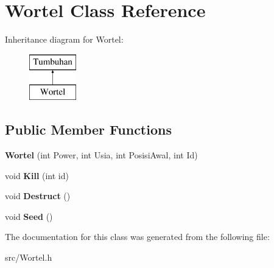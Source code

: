 \hypertarget{class_wortel}{}\section{Wortel Class Reference}
\label{class_wortel}
Inheritance diagram for Wortel\+:\begin{figure}[H]
\begin{center}
\leavevmode
\includegraphics[height=2.000000cm]{class_wortel}
\end{center}
\end{figure}
\subsection*{Public Member Functions}
\begin{DoxyCompactItemize}
\item 
\hypertarget{class_wortel_a5cacd30f4c7133c7a9c657da54f88d16}{}{\bfseries Wortel} (int Power, int Usia, int Posisi\+Awal, int Id)\label{class_wortel_a5cacd30f4c7133c7a9c657da54f88d16}

\item 
\hypertarget{class_wortel_af7a79a9e1b4d15bd3f7498beb0ea8be1}{}void {\bfseries Kill} (int id)\label{class_wortel_af7a79a9e1b4d15bd3f7498beb0ea8be1}

\item 
\hypertarget{class_wortel_a520a82f28b6c65b98605d051768e88b7}{}void {\bfseries Destruct} ()\label{class_wortel_a520a82f28b6c65b98605d051768e88b7}

\item 
\hypertarget{class_wortel_aa5acbe42d876893154b87c924e4e02a4}{}void {\bfseries Seed} ()\label{class_wortel_aa5acbe42d876893154b87c924e4e02a4}

\end{DoxyCompactItemize}


The documentation for this class was generated from the following file\+:\begin{DoxyCompactItemize}
\item 
src/Wortel.\+h\end{DoxyCompactItemize}
